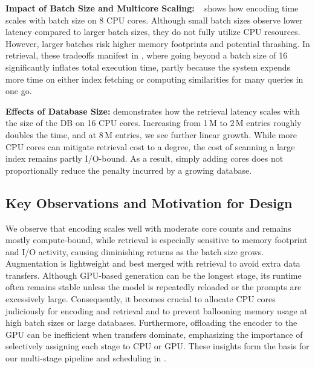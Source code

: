 \noindent\textbf{Impact of Batch Size and Multicore Scaling:} 
~ shows how encoding time scales with batch size on 8 CPU cores. Although small batch sizes observe lower latency compared to larger batch sizes, they do not fully utilize CPU resources. However, larger batches risk higher memory footprints and potential thrashing. In retrieval, these tradeoffs manifest in , where going beyond a batch size of 16 significantly inflates total execution time, partly because the system expends more time on either index fetching or computing similarities for many queries in one go. 

\noindent\textbf{Effects of Database Size:}
 demonstrates how the retrieval latency scales with the size of the DB on 16 CPU cores. Increasing from 1\,M to 2\,M entries roughly doubles the time, and at 8\,M entries, we see further linear growth. While more CPU cores can mitigate retrieval cost to a degree, the cost of scanning a large index remains partly I/O-bound. As a result, simply adding cores does not proportionally reduce the penalty incurred by a growing database.

\subsection{Key Observations and Motivation for Design}
We observe that encoding scales well with moderate core counts and remains mostly compute-bound, while retrieval is especially sensitive to memory footprint and I/O activity, causing diminishing returns as the batch size grows. Augmentation is lightweight and best merged with retrieval to avoid extra data transfers. Although GPU-based generation can be the longest stage, its runtime often remains stable unless the model is repeatedly reloaded or the prompts are excessively large. Consequently, it becomes crucial to allocate CPU cores judiciously for encoding and retrieval and to prevent ballooning memory usage at high batch sizes or large databases. Furthermore, offloading the encoder to the GPU can be inefficient when transfers dominate, emphasizing the importance of selectively assigning each stage to CPU or GPU. These insights form the basis for our multi-stage pipeline and scheduling in .
